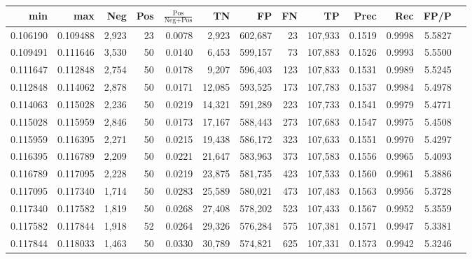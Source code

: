 \begin{tabular}{rrrrrrrrrrrrr}
\toprule
     min &      max &   Neg & Pos & $\frac{\text{Pos}}{\text{Neg}+\text{Pos}}$ &      TN &      FP &      FN &      TP &   Prec &    Rec &   FP/P \\
\midrule
0.106190 & 0.109488 & 2,923 &  23 &                                     0.0078 &   2,923 & 602,687 &      23 & 107,933 & 0.1519 & 0.9998 & 5.5827 \\
0.109491 & 0.111646 & 3,530 &  50 &                                     0.0140 &   6,453 & 599,157 &      73 & 107,883 & 0.1526 & 0.9993 & 5.5500 \\
0.111647 & 0.112848 & 2,754 &  50 &                                     0.0178 &   9,207 & 596,403 &     123 & 107,833 & 0.1531 & 0.9989 & 5.5245 \\
0.112848 & 0.114062 & 2,878 &  50 &                                     0.0171 &  12,085 & 593,525 &     173 & 107,783 & 0.1537 & 0.9984 & 5.4978 \\
0.114063 & 0.115028 & 2,236 &  50 &                                     0.0219 &  14,321 & 591,289 &     223 & 107,733 & 0.1541 & 0.9979 & 5.4771 \\
0.115028 & 0.115959 & 2,846 &  50 &                                     0.0173 &  17,167 & 588,443 &     273 & 107,683 & 0.1547 & 0.9975 & 5.4508 \\
0.115959 & 0.116395 & 2,271 &  50 &                                     0.0215 &  19,438 & 586,172 &     323 & 107,633 & 0.1551 & 0.9970 & 5.4297 \\
0.116395 & 0.116789 & 2,209 &  50 &                                     0.0221 &  21,647 & 583,963 &     373 & 107,583 & 0.1556 & 0.9965 & 5.4093 \\
0.116789 & 0.117095 & 2,228 &  50 &                                     0.0219 &  23,875 & 581,735 &     423 & 107,533 & 0.1560 & 0.9961 & 5.3886 \\
0.117095 & 0.117340 & 1,714 &  50 &                                     0.0283 &  25,589 & 580,021 &     473 & 107,483 & 0.1563 & 0.9956 & 5.3728 \\
0.117340 & 0.117582 & 1,819 &  50 &                                     0.0268 &  27,408 & 578,202 &     523 & 107,433 & 0.1567 & 0.9952 & 5.3559 \\
0.117582 & 0.117844 & 1,918 &  52 &                                     0.0264 &  29,326 & 576,284 &     575 & 107,381 & 0.1571 & 0.9947 & 5.3381 \\
0.117844 & 0.118033 & 1,463 &  50 &                                     0.0330 &  30,789 & 574,821 &     625 & 107,331 & 0.1573 & 0.9942 & 5.3246 \\

\end{tabular}
